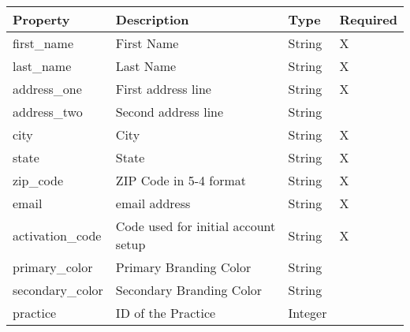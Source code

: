 \documentclass[letterpaper,10pt,english]{sphinxmanual}
\begin{document}
\begin{tabulary}{\linewidth}{|L|L|L|L|}
\hline
\textsf{\relax 
Property
} & \textsf{\relax 
Description
} & \textsf{\relax 
Type
} & \textsf{\relax 
Required
}\\
\hline
first\_name
 & 
First Name
 & 
String
 & 
X
\\

last\_name
 & 
Last Name
 & 
String
 & 
X
\\

address\_one
 & 
First address line
 & 
String
 & 
X
\\

address\_two
 & 
Second address line
 & 
String
 & \\

city
 & 
City
 & 
String
 & 
X
\\

state
 & 
State
 & 
String
 & 
X
\\

zip\_code
 & 
ZIP Code in 5-4 format
 & 
String
 & 
X
\\

email
 & 
email address
 & 
String
 & 
X
\\

activation\_code
 & 
Code used for initial account
setup
 & 
String
 & 
X
\\

primary\_color
 & 
Primary Branding Color
 & 
String
 & \\

secondary\_color
 & 
Secondary Branding Color
 & 
String
 & \\

practice
 & 
ID of the Practice
 & 
Integer
 & \\
\hline\end{tabulary}
\end{document}
